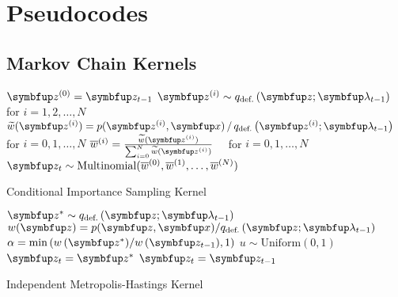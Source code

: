 
\section{Pseudocodes}\label{section:pseudocode}
\subsection{Markov Chain Kernels}


  \begin{center}
\begin{minipage}[c]{0.63\textwidth}
  \begin{algorithm2e}[H]
    \DontPrintSemicolon
    \SetAlgoLined
    \(\vz^{(0)} = \vz_{t-1}\) \;
    \(\vz^{(i)} \sim q_{\text{def.}}\left(\vz;\vlambda_{t-1}\right)\quad\) for \(i = 1, 2,\ldots, N\) \;
    \(\widetilde{w}(\vz^{(i)}) = p(\vz^{(i)},\vx) \,/\, q_{\text{def.}}\left(\vz^{(i)}; \vlambda_{t-1}\right)\quad\) for \(i = 0, 1,\ldots, N\)\;
    \(\overline{w}^{(i)} = \frac{\widetilde{w}(\vz^{(i)})}{ \sum^{N}_{i=0} \widetilde{w}(\vz^{(i)}) }\quad\) for \(i = 0, 1,\ldots, N\)\;
    \(\vz_{t} \sim \mathrm{Multinomial}(\overline{w}^{(0)}, \overline{w}^{(1)}, \ldots, \overline{w}^{(N)}) \)\;
    \caption{Conditional Importance Sampling Kernel}
  \end{algorithm2e}
\end{minipage}
  \end{center}

  \begin{center}
\begin{minipage}[c]{0.62\textwidth}
  \begin{algorithm2e}[H]
    \DontPrintSemicolon
    \SetAlgoLined
    \(\vz^* \sim q_{\text{def.}}\left(\vz; \vlambda_{t-1}\right)\)\;
    \(w(\vz) = p(\vz,\vx)/q_{\text{def.}}\left(\vz; \vlambda_{t-1}\right) \)\;
    \(\alpha = \min\left( w\,(\vz^*)/w\,(\vz_{t-1}), 1\right)\)\;
    \(u \sim \mathrm{Uniform}(0, 1) \)\;
        {
          \(\vz_t = \vz^*\)
        }
        {
          \(\vz_t = \vz_{t-1}\)
        }
        \caption{Independent Metropolis-Hastings Kernel}
  \end{algorithm2e}
\end{minipage}
  \end{center}

